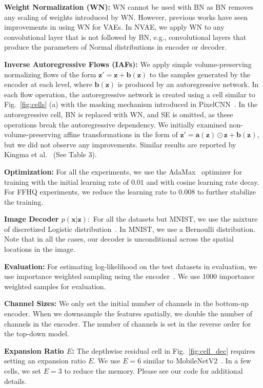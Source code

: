 \documentclass{article}
\newcommand{\x}{{\pmb{x}}}
\newcommand{\z}{{\pmb{z}}}
\renewcommand{\a}{{\pmb{a}}}
\renewcommand{\b}{{\pmb{b}}}
\begin{document}
\textbf{Weight Normalization (WN):} WN cannot be used with BN as BN removes any scaling of weights introduced by WN. However, previous works have seen improvements in using WN for VAEs. In NVAE, we apply WN to any convolutional layer that is not followed by BN, e.g., convolutional layers that produce the parameters of Normal distributions in encoder or decoder. 

\textbf{Inverse Autoregressive Flows (IAFs):} We apply simple volume-preserving normalizing flows of the form $\z' = \z + \b(\z)$ to the samples generated by the encoder at each level, where $\b(\z)$ is produced by an autoregressive network.  In each flow operation, the autoregressive network is created using a cell similar to Fig.~\ref{fig:cells} (a) with the masking mechanism introduced in PixelCNN~\cite{van2016pixel}. In the autoregressive cell, BN is replaced with WN, and SE is omitted, as these operations break the autoregressive dependency. We initially examined non-volume-preserving affine transformations in the form of $\z' = \a(\z) \odot \z + \b(\z)$, but we did not observe any improvements. Similar results are reported by Kingma et al.~\cite{kingma2016improved} (See Table 3).

\textbf{Optimization:} For all the experiments, we use the AdaMax~\cite{kingma2014adam} optimizer for training with the initial learning rate of $0.01$ and with cosine learning rate decay. For FFHQ experiments, we reduce the learning rate to $0.008$ to further stabilize the training.

\textbf{Image Decoder $p(\x|\z):$} For all the datasets but MNIST, we use the mixture of discretized Logistic distribution~\cite{salimans2017pixelcnn++}. In MNIST, we use a Bernoulli distribution. Note that in all the cases, our decoder is unconditional across the spatial locations in the image. 

\textbf{Evaluation:} For estimating log-likelihood on the test datasets in evaluation, we use importance weighted sampling using the encoder~\cite{burda2015importance}. We use 1000 importance weighted samples for evaluation.

\textbf{Channel Sizes:} We only set the initial number of channels in the bottom-up encoder. When we downsample the features spatially, we double the number of channels in the encoder. The number of channels is set in the reverse order for the top-down model.

\textbf{Expansion Ratio $E$:} The depthwise residual cell in Fig.~\ref{fig:cell_dec} requires setting an expansion ratio $E$. We use $E=6$ similar to MobileNetV2~\cite{sandler2018mobilenetv2}. In a few cells, we set $E=3$ to reduce the memory. Please see our code for additional details.
\end{document}
